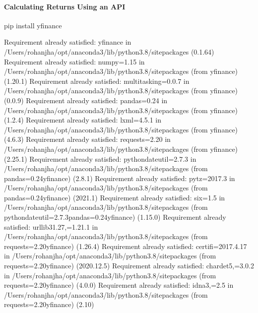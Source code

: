 \documentclass[letterpaper,10pt,english]{jupyterBook}
\begin{document}
\paragraph{Calculating Returns Using an API}
\label{\detokenize{content/10-finance/options:calculating-returns-using-an-api}}
\begin{sphinxVerbatim}[commandchars=\\\{\}]
pip install yfinance
   
   
\end{sphinxVerbatim}

\begin{sphinxVerbatim}[commandchars=\\\{\}]
Requirement already satisfied: yfinance in /Users/rohanjha/opt/anaconda3/lib/python3.8/site\PYGZhy{}packages (0.1.64)
Requirement already satisfied: numpy\PYGZgt{}=1.15 in /Users/rohanjha/opt/anaconda3/lib/python3.8/site\PYGZhy{}packages (from yfinance) (1.20.1)
Requirement already satisfied: multitasking\PYGZgt{}=0.0.7 in /Users/rohanjha/opt/anaconda3/lib/python3.8/site\PYGZhy{}packages (from yfinance) (0.0.9)
Requirement already satisfied: pandas\PYGZgt{}=0.24 in /Users/rohanjha/opt/anaconda3/lib/python3.8/site\PYGZhy{}packages (from yfinance) (1.2.4)
Requirement already satisfied: lxml\PYGZgt{}=4.5.1 in /Users/rohanjha/opt/anaconda3/lib/python3.8/site\PYGZhy{}packages (from yfinance) (4.6.3)
Requirement already satisfied: requests\PYGZgt{}=2.20 in /Users/rohanjha/opt/anaconda3/lib/python3.8/site\PYGZhy{}packages (from yfinance) (2.25.1)
Requirement already satisfied: python\PYGZhy{}dateutil\PYGZgt{}=2.7.3 in /Users/rohanjha/opt/anaconda3/lib/python3.8/site\PYGZhy{}packages (from pandas\PYGZgt{}=0.24\PYGZhy{}\PYGZgt{}yfinance) (2.8.1)
Requirement already satisfied: pytz\PYGZgt{}=2017.3 in /Users/rohanjha/opt/anaconda3/lib/python3.8/site\PYGZhy{}packages (from pandas\PYGZgt{}=0.24\PYGZhy{}\PYGZgt{}yfinance) (2021.1)
Requirement already satisfied: six\PYGZgt{}=1.5 in /Users/rohanjha/opt/anaconda3/lib/python3.8/site\PYGZhy{}packages (from python\PYGZhy{}dateutil\PYGZgt{}=2.7.3\PYGZhy{}\PYGZgt{}pandas\PYGZgt{}=0.24\PYGZhy{}\PYGZgt{}yfinance) (1.15.0)
Requirement already satisfied: urllib3\PYGZlt{}1.27,\PYGZgt{}=1.21.1 in /Users/rohanjha/opt/anaconda3/lib/python3.8/site\PYGZhy{}packages (from requests\PYGZgt{}=2.20\PYGZhy{}\PYGZgt{}yfinance) (1.26.4)
Requirement already satisfied: certifi\PYGZgt{}=2017.4.17 in /Users/rohanjha/opt/anaconda3/lib/python3.8/site\PYGZhy{}packages (from requests\PYGZgt{}=2.20\PYGZhy{}\PYGZgt{}yfinance) (2020.12.5)
Requirement already satisfied: chardet\PYGZlt{}5,\PYGZgt{}=3.0.2 in /Users/rohanjha/opt/anaconda3/lib/python3.8/site\PYGZhy{}packages (from requests\PYGZgt{}=2.20\PYGZhy{}\PYGZgt{}yfinance) (4.0.0)
Requirement already satisfied: idna\PYGZlt{}3,\PYGZgt{}=2.5 in /Users/rohanjha/opt/anaconda3/lib/python3.8/site\PYGZhy{}packages (from requests\PYGZgt{}=2.20\PYGZhy{}\PYGZgt{}yfinance) (2.10)
\end{sphinxVerbatim}
\end{document}
